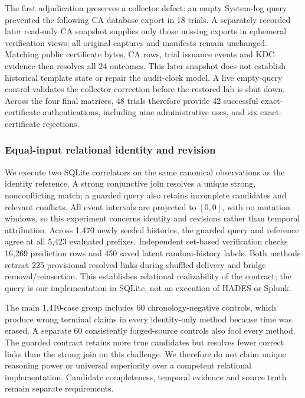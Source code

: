 The first adjudication preserves a collector defect: an empty System-log query prevented the following CA database export in 18 trials. A separately recorded later read-only CA snapshot supplies only those missing exports in ephemeral verification views; all original captures and manifests remain unchanged. Matching public certificate bytes, CA rows, trial issuance events and KDC evidence then resolves all 24 outcomes. This later snapshot does not establish historical template state or repair the audit-clock model. A live empty-query control validates the collector correction before the restored lab is shut down. Across the four final matrices, 48 trials therefore provide 42 successful exact-certificate authentications, including nine administrative uses, and six exact-certificate rejections.

\subsubsection{Equal-input relational identity and revision}
We execute two SQLite correlators on the same canonical observations as the identity reference. A strong conjunctive join resolves a unique strong, nonconflicting match; a guarded query also retains incomplete candidates and relevant conflicts. All event intervals are projected to $[0,0]$, with no mutation windows, so this experiment concerns identity and revisions rather than temporal attribution. Across 1,470 newly seeded histories, the guarded query and reference agree at all 5,423 evaluated prefixes. Independent set-based verification checks 16,269 prediction rows and 450 saved latent random-history labels. Both methods retract 225 provisional resolved links during shuffled delivery and bridge removal/reinsertion. This establishes relational realizability of the contract; the query is our implementation in SQLite, not an execution of HADES or Splunk.



The main 1,410-case group includes 60 chronology-negative controls, which produce wrong terminal claims in every identity-only method because time was erased. A separate 60 consistently forged-source controls also fool every method. The guarded contract retains more true candidates but resolves fewer correct links than the strong join on this challenge. We therefore do not claim unique reasoning power or universal superiority over a competent relational implementation. Candidate completeness, temporal evidence and source truth remain separate requirements.

